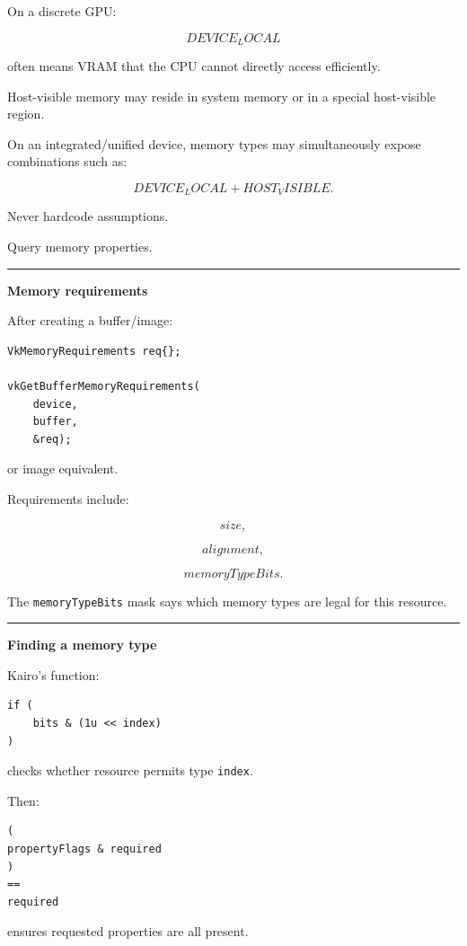 On a discrete GPU:

\[
DEVICE_LOCAL
\]

often means VRAM that the CPU cannot directly access efficiently.

Host-visible memory may reside in system memory or in a special host-visible region.

On an integrated/unified device, memory types may simultaneously expose combinations such as:

\[
DEVICE_LOCAL
+
HOST_VISIBLE.
\]

Never hardcode assumptions.

Query memory properties.

\begin{center}\rule{0.5\linewidth}{0.5pt}\end{center}

\textbf{Memory requirements}

After creating a buffer/image:

\begin{verbatim}
VkMemoryRequirements req{};

vkGetBufferMemoryRequirements(
    device,
    buffer,
    &req);
\end{verbatim}

or image equivalent.

Requirements include:

\[
size,
\]

\[
alignment,
\]

\[
memoryTypeBits.
\]

The \texttt{memoryTypeBits} mask says which memory types are legal for this resource.

\begin{center}\rule{0.5\linewidth}{0.5pt}\end{center}

\textbf{Finding a memory type}

Kairo's function:

\begin{verbatim}
if (
    bits & (1u << index)
)
\end{verbatim}

checks whether resource permits type \texttt{index}.

Then:

\begin{verbatim}
(
propertyFlags & required
)
==
required
\end{verbatim}

ensures requested properties are all present.

